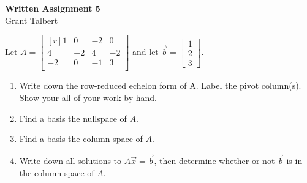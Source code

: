 \documentclass{article}
\theoremstyle{definition}
\begin{document}
\thispagestyle{fancy}
\pagestyle{fancy}
\begin{center}
\textbf{Written Assignment 5}\\
Grant Talbert
\end{center}
\begin{exercise}
    Let  $A=\begin{bmatrix}[r]
    1&0&-2&0\\
    4&-2&4&-2\\
    -2&0&-1&3\\
    \end{bmatrix}$ and let $\vec{b} =\begin{bmatrix}
    1\\2\\3
    \end{bmatrix}.$
    \begin{enumerate}
    \item Write down the row-reduced echelon form of A.  Label the pivot column(s). Show your all of your work by hand.  
    \item Find a basis the nullspace of $A$.  
    \item Find a basis the column space of $A$.
    \item Write down all solutions to $A\vec{x}=\vec{b}$, then determine whether or not $\vec{b}$ is in the column space of $A$. 
    \end{enumerate}
\end{exercise}
\end{document}
